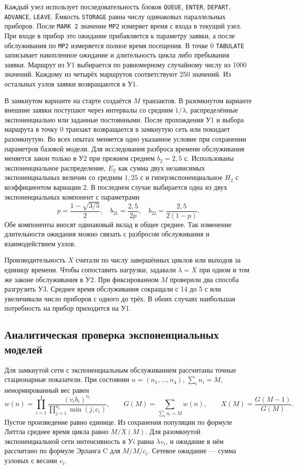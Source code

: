 Каждый узел использует последовательность блоков \texttt{QUEUE},
\texttt{ENTER}, \texttt{DEPART}, \texttt{ADVANCE}, \texttt{LEAVE}.
Ёмкость \texttt{STORAGE} равна числу одинаковых параллельных приборов.
После \texttt{MARK~2} значение \texttt{MP2} измеряет время с входа
в текущий узел. При входе в прибор это ожидание прибавляется к
параметру заявки, а после обслуживания по \texttt{MP2} измеряется
полное время посещения. В точке 0 \texttt{TABULATE} записывает
накопленное ожидание и длительность цикла либо пребывания заявки.
Маршрут из У1 выбирается по равномерному случайному числу из
1000 значений. Каждому из четырёх маршрутов соответствуют
250 значений. Из остальных узлов заявки возвращаются в У1.

В замкнутом варианте на старте создаётся \(M\) транзактов. В
разомкнутом варианте внешние заявки поступают через интервалы со
средним \(1/\lambda\), распределённые экспоненциально или заданные
постоянными. После прохождения У1 и выбора маршрута в точку 0
транзакт возвращается в замкнутую сеть или покидает разомкнутую.
Во всех опытах меняется одно указанное условие при сохранении
параметров базовой модели. Для исследования разброса времени
обслуживания меняется закон только в У2 при прежнем среднем
\(b_2=2{,}5\) с. Использованы экспоненциальное распределение,
\(E_2\) как сумма двух независимых экспоненциальных величин со
средним \(1{,}25\) с и гиперэкспоненциальное \(H_2\) с
коэффициентом вариации 2. В последнем случае выбирается одна из
двух экспоненциальных компонент с параметрами
\[
  p=\frac{1-\sqrt{3/5}}{2},\quad
  b_{21}=\frac{2{,}5}{2p},\quad b_{22}=\frac{2{,}5}{2(1-p)}.
\]
Обе компоненты вносят одинаковый вклад в общее среднее. Так
изменение длительности ожидания можно связать с разбросом
обслуживания и взаимодействием узлов.

Производительность \(X\) считали по числу завершённых циклов
или выходов за единицу времени. Чтобы сопоставить нагрузки, задавали
\(\lambda=X\) при одном и том же законе обслуживания в У2.
При фиксированном \(M\) проверили два способа разгрузить У3.
Среднее время обслуживания сокращали с 14 до 5 с или увеличивали
число приборов с одного до трёх. В обоих случаях наибольшая
потребность на прибор приходится на У1.

\subsection{Аналитическая проверка экспоненциальных моделей}

Для замкнутой сети с экспоненциальным обслуживанием рассчитаны
точные стационарные показатели. При состоянии
\(n=(n_1,\ldots,n_4)\), \(\sum_i n_i=M\), ненормированный вес равен
\[
  w(n)=\prod_{i=1}^4
      \frac{(v_i b_i)^{n_i}}{\prod_{j=1}^{n_i}\min(j,c_i)},\qquad
  G(M)=\sum_{\sum_i n_i=M}w(n),\qquad X(M)=\frac{G(M-1)}{G(M)}.
\]
Пустое произведение равно единице. Из сохранения популяции по
формуле Литтла среднее время цикла равно \(M/X(M)\). Для
разомкнутой экспоненциальной сети интенсивность в У\(i\) равна
\(\lambda v_i\), и ожидание в нём рассчитано по формуле Эрланга C
для \(M/M/c_i\). Сетевое ожидание — сумма узловых с весами \(v_i\).

